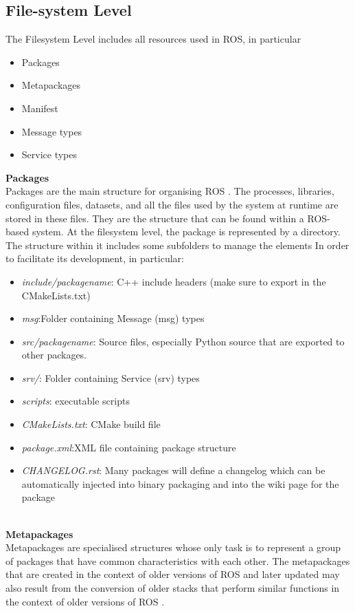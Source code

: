 \subsection{File-system Level}
The Filesystem Level includes all resources used in ROS, in particular
\begin{itemize}
    \item Packages
    \item Metapackages
    \item Manifest
    \item Message types
    \item Service types
\end{itemize}
\textbf{Packages}\\
Packages are the main structure for organising ROS  \citet{rospackages}. The processes, libraries, configuration files, datasets, and all the files used by the system at runtime are stored in these files. They are the structure that can be found within a ROS-based system. At the filesystem level, the package is represented by a directory. The structure within it includes some subfolders to manage the elements
In order to facilitate its development, in particular:
\begin{itemize}
    \item \textit{include/packagename}: C++ include headers (make sure to export in the CMakeLists.txt)
    \item \textit{msg}:Folder containing Message (msg) types
    \item \textit{src/packagename}: Source files, especially Python source that are exported to other packages.
    \item \textit{srv/}: Folder containing Service (srv) types
    \item \textit{scripts}: executable scripts
    \item \textit{CMakeLists.txt}: CMake build file
    \item \textit{package.xml}:XML file containing package structure 
    \item \textit{CHANGELOG.rst}: Many packages will define a changelog which can be automatically injected into binary packaging and into the wiki page for the package
\end{itemize}\\
\textbf{Metapackages}\\
Metapackages are specialised structures whose only task is to represent a group of packages that have common characteristics with each other. The metapackages that are created in the context of older versions of ROS and later updated may also result from the conversion of older stacks that perform similar functions in the context of older versions of ROS \citet{rosmetapackages}.\\
